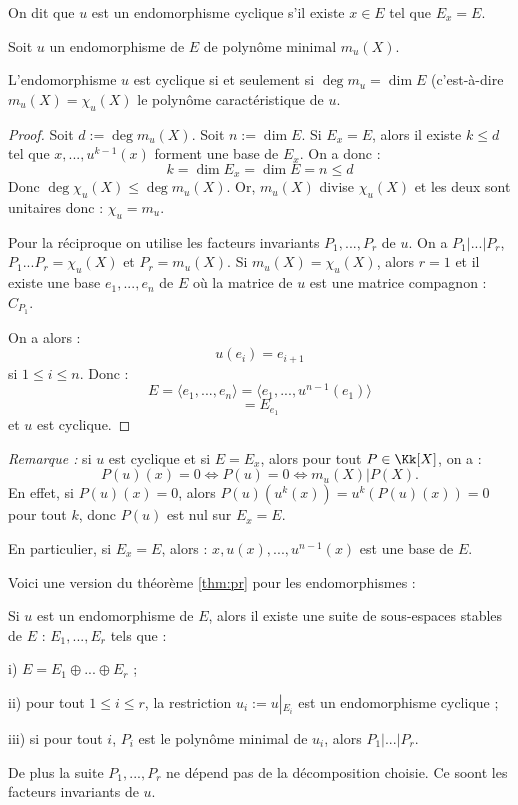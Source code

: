 \documentclass[class=report,crop=false]{standalone}
\newcommand{\Res}[1]{{\left | {}_{#1} \right.}}
\begin{document}
\begin{definition}
On dit que $u$ est un endomorphisme cyclique s'il existe $x \in E$ tel que $E_x =E$.

\end{definition}

\begin{proposition}
Soit $u$ un endomorphisme de $E$ de polynôme minimal $m_u(X)$.

L'endomorphisme $u$ est  cyclique  si et seulement si $\deg m_u = \dim E$ (c'est-à-dire $m_u(X) =\chi_u(X)$ le polynôme caractéristique de $u$.
\end{proposition}

\begin{proof}
Soit $d:=\deg m_u(X)$. Soit $n:=\dim E$. Si $E_x =E$, alors il existe $k \le d$ tel que $x,...,u^{k-1}(x)$ forment une base de $E_x$. On a donc :
\[k = \dim E_x = \dim E = n \le d\]
Donc $\deg \chi_u(X) \le \deg m_u(X)$. Or, $m_u(X)$ divise $\chi_u(X)$ et les deux sont unitaires donc : $\chi_u = m_u$.

Pour la réciproque on utilise les facteurs invariants $P_1,...,P_r$ de $u$. On a $P_1 | ... | P_r$, $P_1...P_r = \chi_u(X)$ et $P_r = m_u(X)$. Si $m_u(X) = \chi_u(X)$, alors $r=1$ et il existe une base $e_1,...,e_n$ de $E$ où la matrice de $u$ est une matrice compagnon : $C_{P_1}$.

On a alors :
\[u(e_i) = e_{i+1}\]
si $1\le i\le n$. Donc :
\[E = \langle e_1,...,e_n\rangle = \langle e_1 ,..., u^{n-1}(e_1) \rangle\]
\[= E_{e_1}\]
et $u$ est cyclique.

\end{proof}

{\it Remarque :} si $u$ est cyclique et si $E=E_x$, alors pour tout $P \in \Kk[X]$, on a :
\[P(u)(x) = 0 \iff P(u) = 0 \iff m_u(X) | P(X) .\]
En effet, si $P(u)(x) =0$, alors $P(u)(u^k(x)) = u^k(P(u)(x)) = 0$ pour tout $k$, donc  $P(u)$ est nul sur $E_x=E$.

En particulier, si $E_x=E$, alors : $x, u(x),...,u^{n-1}(x)$ est une base de $E$.

Voici une version du théorème \ref{thm:pr} pour les endomorphismes :
\begin{theoreme}\label{thm:prend}
Si $u$ est un endomorphisme de $E$, alors il existe une suite de sous-espaces stables de $E$ : $E_1,...,E_r$ tels que :

i) $E = E_1 \oplus ...\oplus E_r$ ;

ii) pour tout $1 \le i \le r$, la restriction $u_i := u\Res{E_i}$ est un endomorphisme cyclique ;

iii) si pour tout $i$, $P_i$ est le polynôme minimal de $u_i$, alors $P_1 | ...|P_r$.

De plus la suite $P_1,...,P_r$ ne dépend pas de la décomposition choisie. Ce soont les facteurs invariants de $u$.
\end{theoreme}
\end{document}

